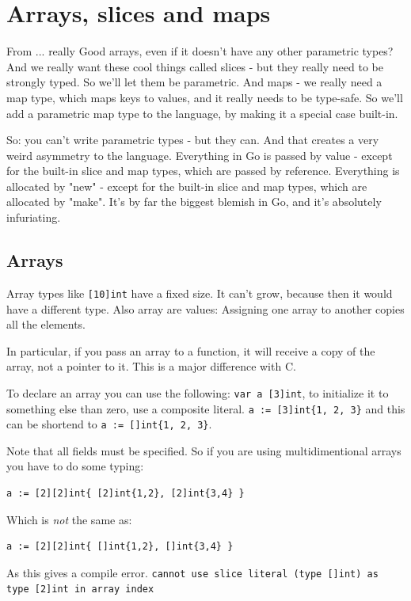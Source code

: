 \section{Arrays, slices and  maps}
From \cite{go_intro} ... really Good \draft{}
%
arrays, even if it doesn't have any other parametric types? And we really want
these cool things called slices - but they really need to be strongly typed. So
we'll let them be parametric. And maps - we really need a map type, which maps
keys to values, and it really needs to be type-safe. So we'll add a parametric
map type to the language, by making it a special case built-in.

So: you can't write parametric types - but they can. And that creates a very
weird asymmetry to the language. Everything in Go is passed by value - except
for the built-in slice and map types, which are passed by reference. Everything
is allocated by "new" - except for the built-in slice and map types, which are
allocated by "make". It's by far the biggest blemish in Go, and it's absolutely
infuriating.

\subsection{Arrays}
Array types like \lstinline{[10]int} have a fixed size. 
It can't grow, because then it would have a different type. Also array
are values: Assigning one array to another copies all the elements.

In particular, if you pass an array to a function, it will receive a
copy of the array, not a pointer to it. This is a major difference with
C.

To declare an array you can use the following: \lstinline{var a [3]int},
to initialize it to something else than zero, use a composite literal.
\lstinline|a := [3]int{1, 2, 3}| and
this can be shortend to \lstinline|a := []int{1, 2, 3}|.

Note that all fields must be specified.  So if you are using multidimentional
arrays you have to do some typing:
\begin{lstlisting}
a := [2][2]int{ [2]int{1,2}, [2]int{3,4} }
\end{lstlisting}
Which is \emph{not} the same as:
\begin{lstlisting}
a := [2][2]int{ []int{1,2}, []int{3,4} }
\end{lstlisting}
As this gives a compile error.\newline
\lstinline{cannot use slice literal (type []int) as type [2]int in array index}

